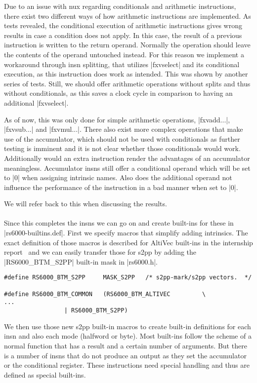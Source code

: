 Due to an issue with nux regarding conditionals and arithmetic instructions, there exist two different ways of how arithmetic instructions are implemented.
As tests revealed, the conditional execution of arithmetic instructions gives wrong results in case a condition does not apply.
In this case, the result of a previous instruction is written to the return operand.
Normally the operation should leave the contents of the operand untouched instead.
For this reason we implement a workaround through insn splitting, that utilizes |fxvselect| and its conditional execution, as this instruction does work as intended.
This was shown by another series of tests.
Still, we should offer arithmetic operations without splits and thus without conditionals, as this saves a clock cycle in comparison to having an additional |fxvselect|.

As of now, this was only done for simple arithmetic operations, |fxvadd...|, |fxvsub...| and |fxvmul...|.
There also exist more complex operations that make use of the accumulator, which should not be used with conditionals as further testing is imminent and it is not clear whether those conditionals would work.
Additionally would an extra instruction render the advantages of an accumulator meaningless.
Accumulator insns still offer a conditional operand which will be set to |0| when assigning intrinsic names.
Also does the additional operand not influence the performance of the instruction in a bad manner when set to |0|.

We will refer back to this when discussing the results.
\\
\\
Since this completes the insns we can go on and create built-ins for these in |rs6000-builtins.def|.
First we specify macros that simplify adding intrinsics.
The exact definition of those macros is described for AltiVec built-ins in the internship report~\citep{heimbrecht_2017internship} and we can easily transfer those for s2pp by adding the |RS6000_BTM_S2PP| built-in mask in |rs6000.h|.
\begin{lstlisting}
#define RS6000_BTM_S2PP     MASK_S2PP   /* s2pp-mark/s2pp vectors.  */

#define RS6000_BTM_COMMON   (RS6000_BTM_ALTIVEC         \
...
                 | RS6000_BTM_S2PP)
\end{lstlisting}

We then use those new s2pp built-in macros to create built-in definitions for each insn and also each mode (halfword or byte).
Most built-ins follow the scheme of a normal function that has a result and a certain number of arguments.
But there is a number of insns that do not produce an output as they set the accumulator or the conditional register.
These instructions need special handling and thus are defined as special built-ins.

